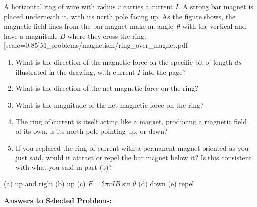 \begin{Exercise}
A horizontal ring of wire with radius $r$ carries a current $I$.
A strong bar magnet is placed underneath it, with its north pole facing up.  
As the figure shows, the magnetic field lines from the bar magnet make an angle~$\theta$ 
with the vertical and have a magnitude $B$ where they cross the ring. 
[scale=0.85]{M_problems/magnetism/ring_over_magnet.pdf}{
\begin{enumerate}[labparts]
\newpage
\item What is the direction of the magnetic force on the specific bit o' length $ds$ illustrated in the drawing, with current $I$ into the page?  
\newpage
\item What is the direction of the net magnetic force on the ring?  
\newpage
\item What is the magnitude of the net magnetic force on the ring?  
\item The ring of current is itself acting like a magnet, producing a magnetic field of its own.  Is its north pole pointing up, or down?  
\item If you replaced the ring of current with a permanent magnet oriented as you just said, would it attract or repel the bar magnet below it?  Is this consistent with what you said in part (b)?
\end{enumerate}
}
\end{Exercise}
\begin{Answer}
(a) up and right (b) up (c) $F=2\pi rIB \sin \theta$ (d) down (e) repel
\end{Answer}




\vspace{0.7in}

\textbf{Answers to Selected {\thesubsection} Problems:}
\label{magnetism_prob_answers}
\shipoutAnswer

\cleardoublepage
